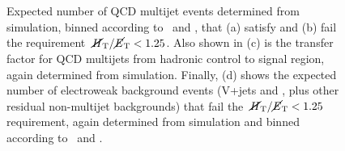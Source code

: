 \begin{figure}[!h]
  \centering
   ~
   \\
   ~ 
   \\
  \caption{Expected number of QCD multijet events determined from
    simulation, binned according to \njet~and \scalht, that (a) satisfy
    and (b) fail the requirement $\mbox{$\mbox{$\,\cancel{H}_{\rm T}$} / \mbox{$\cancel{E}_\text{T}$}$} < 1.25$. Also shown in (c)
    is the transfer factor for QCD multijets from hadronic control to signal region, 
    again determined from simulation. Finally, (d) shows the expected number of electroweak 
    background events (V+jets and \ttbar, plus other residual non-multijet backgrounds)
    that fail the $\mbox{$\mbox{$\,\cancel{H}_{\rm T}$} / \mbox{$\cancel{E}_\text{T}$}$} < 1.25$ requirement, again determined from
    simulation and binned according to \njet~and \scalht.}
  \label{fig:qcd_plots}
\end{figure}

